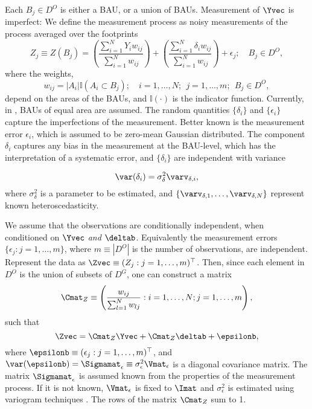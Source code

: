 Each $B_j \in D^O$ is either a BAU, or a union of BAUs. Measurement of $\Yvec$ is imperfect: We define the measurement process as noisy measurements of the process averaged over the footprints
\begin{equation}\label{eq:meas_process}
Z_j \equiv Z(B_j) = \left(\frac{\sum_{i =1}^N Y_i w_{ij}}{\sum_{i=1}^N w_{ij}}\right) + \left(\frac{\sum_{i =1}^N \delta_i w_{ij}}{\sum_{i=1}^N w_{ij}}\right) + \epsilon_j; \quad B_j \in D^O,
\end{equation}
where the weights,
$$ w_{ij} = |A_i|\mathbb{I}(A_i \subset B_j); \quad i = 1,\dots,N;~~j = 1,\dots, m; ~~B_j \in D^O,$$
depend on the areas of the BAUs, and $\mathbb{I}(\cdot)$ is the indicator function. Currently, in , BAUs of equal area are assumed.   The random quantities $\{\delta_i\}$ and $\{\epsilon_i\}$ capture the imperfections of the measurement. Better known is the measurement error $\epsilon_i$, which is assumed to be zero-mean Gaussian distributed. The component $\delta_i$ captures any bias in the measurement at the BAU-level, which has the interpretation of a systematic error, and $\{\delta_i\}$ are independent with variance


\begin{equation*}
\var(\delta_i) = \sigma^2_\delta \varv_{\delta,i},
\end{equation*}
where $\sigma^2_\delta$ is a parameter to be estimated, and $\{\varv_{\delta,1},\dots,\varv_{\delta,N}\}$  represent known heteroscedasticity.

We assume that the observations are conditionally independent, when conditioned on $\Yvec$ \emph{and} $\deltab$. Equivalently the measurement errors $\{\epsilon_j: j = 1,\dots,m\}$, where $m \equiv |D^O|$ is the number of observations, are independent. Represent the data as $\Zvec \equiv (Z_j : j = 1,\dots,m)^\top$. Then, since each element in $D^O$ is the union of subsets of $D^G$, one can construct a matrix
$$
\Cmat_Z \equiv \left(\frac{w_{ij}}{\sum_{l=1}^N w_{lj}} : i = 1,\dots,N; j = 1,\dots,m\right),
$$
such that
\begin{equation*}
\Zvec = \Cmat_Z\Yvec + \Cmat_Z\deltab +  \epsilonb,
\end{equation*}
\noindent where $\epsilonb \equiv (\epsilon_j : j = 1,\dots,m)^\top$, and $\var(\epsilonb) = \Sigmamat_\epsilon \equiv \sigma^2_\epsilon\Vmat_\epsilon$ is a diagonal covariance matrix. The matrix $\Sigmamat_\epsilon$ is assumed known from the properties of the measurement process. If it is not known, $\Vmat_\epsilon$ is fixed to $\Imat$ and $\sigma^2_\epsilon$ is estimated using variogram techniques \citep{Kang_2009}. The rows of  the matrix $\Cmat_Z$ sum to 1.

